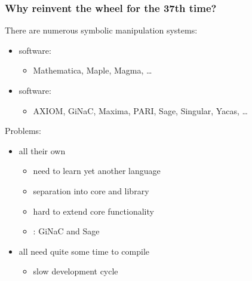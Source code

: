 \documentclass{beamer}
\begin{document}
\begin{frame}[fragile]
    \frametitle{Why reinvent the wheel for the 37th time?}

    There are numerous symbolic manipulation systems:
    \begin{itemize}
        \item {} software:
            \begin{itemize}
                \item Mathematica, Maple, Magma, \ldots
            \end{itemize}
        \item {} software:
            \begin{itemize}
                \item AXIOM, GiNaC, Maxima, PARI, Sage, Singular, Yacas, \ldots
            \end{itemize}
    \end{itemize}
    \pause
    {\color{red} Problems:}
    \begin{itemize}
        \item all  their own 
            \begin{itemize}
                \item need to learn yet another language
                \item separation into core and library
                \item hard to extend core functionality
                \item {}: GiNaC and Sage
            \end{itemize}
        \item all need quite some time to compile
            \begin{itemize}
                \item slow development cycle
            \end{itemize}
    \end{itemize}
\end{frame}
\end{document}
